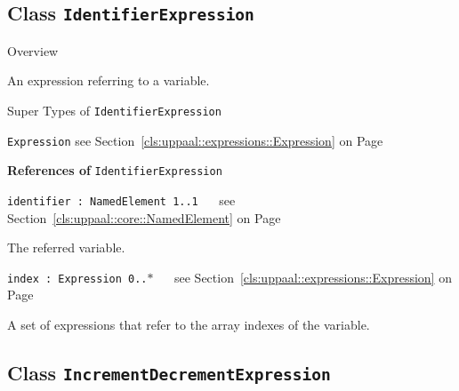\subsection{Class \bfseries \texttt{IdentifierExpression}\normalfont}
\label{cls:uppaal::expressions::IdentifierExpression} 
	
	\begin{longdescription}
		\item[Overview] 		
				

	

		An expression referring to a variable.		
		\item[Super Types of \texttt{IdentifierExpression}] ~
			\begin{longdescription}
				\item[\texttt{Expression}] see Section~\ref{cls:uppaal::expressions::Expression} on Page~\pageref{cls:uppaal::expressions::Expression}						\end{longdescription}
		
	
			\item[\textbf{References of} \texttt{IdentifierExpression}] ~
			\begin{longdescription}
	\item[\texttt{identifier : NamedElement 	\symbol{"5B}1..1\symbol{"5D}
}] ~
	see Section~\ref{cls:uppaal::core::NamedElement} on Page~\pageref{cls:uppaal::core::NamedElement}
	
	\nopagebreak
		
				

	

		The referred variable.		
	\item[\texttt{index : Expression 	\symbol{"5B}0..$*$\symbol{"5D}
}] ~
	see Section~\ref{cls:uppaal::expressions::Expression} on Page~\pageref{cls:uppaal::expressions::Expression}
	
	\nopagebreak
		
				

	

		A set of expressions that refer to the array indexes of the variable.		
			\end{longdescription}
	
	\end{longdescription}
	

\subsection{Class \bfseries \texttt{IncrementDecrementExpression}\normalfont}
\label{cls:uppaal::expressions::IncrementDecrementExpression} 
	
